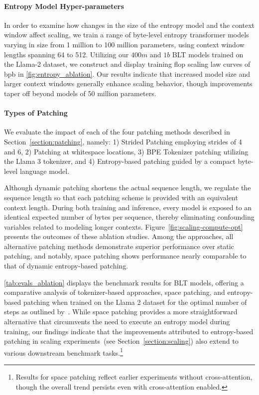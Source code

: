 \paragraph{Entropy Model Hyper-parameters} In order to examine how changes in the size of the entropy model and the context window affect scaling, we train a range of byte-level entropy transformer models varying in size from 1 million to 100 million parameters, using context window lengths spanning 64 to 512. Utilizing our $400m$ and $1b$ {\textsc BLT} models trained on the Llama-2 dataset, we construct and display training flop scaling law curves of bpb in \autoref{fig:entropy_ablation}. Our results indicate that increased model size and larger context windows generally enhance scaling behavior, though improvements taper off beyond models of 50 million parameters.

\paragraph{Types of Patching}

We evaluate the impact of each of the four patching methods described in Section~\ref{section:patching}, namely: 1) Strided Patching employing strides of 4 and 6, 2) Patching at whitespace locations, 3) BPE Tokenizer patching utilizing the Llama 3 tokenizer, and 4) Entropy-based patching guided by a compact byte-level language model.

Although dynamic patching shortens the actual sequence length, we regulate the sequence length so that each patching scheme is provided with an equivalent context length. During both training and inference, every model is exposed to an identical expected number of bytes per sequence, thereby eliminating confounding variables related to modeling longer contexts. Figure~\ref{fig:scaling-compute-opt} presents the outcomes of these ablation studies. Among the approaches, all alternative patching methods demonstrate superior performance over static patching, and notably, space patching shows performance nearly comparable to that of dynamic entropy-based patching.

\autoref{tab:evals_ablation} displays the benchmark results for {\textsc BLT} models, offering a comparative analysis of tokenizer-based approaches, space patching, and entropy-based patching when trained on the Llama 2 dataset for the optimal number of steps as outlined by~\citet{dubey2024llama}. While space patching provides a more straightforward alternative that circumvents the need to execute an entropy model during training, our findings indicate that the improvements attributed to entropy-based patching in scaling experiments~(see Section~\ref{section:scaling}) also extend to various downstream benchmark tasks.\footnote{Results for space patching reflect earlier experiments without cross-attention, though the overall trend persists even with cross-attention enabled.}

